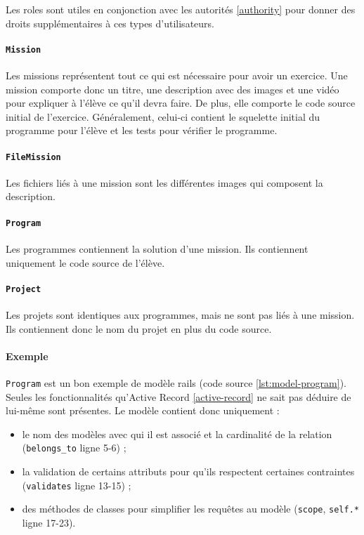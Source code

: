 Les \glspl{role} sont utiles en conjonction avec les autorités \ref{authority} pour donner des droits supplémentaires à ces types d'utilisateurs.

\paragraph{\texttt{Mission}} Les \glspl{mission} représentent tout ce qui est nécessaire pour avoir un exercice. Une \gls{mission} comporte donc un titre, une description avec des images et une vidéo pour expliquer à l'élève ce qu'il devra faire. De plus, elle comporte le code source initial de l'exercice. Généralement, celui-ci contient le squelette initial du programme pour l'élève et les tests pour vérifier le programme.

\paragraph{\texttt{FileMission}} Les fichiers liés à une \gls{mission} sont les différentes images qui composent la description.

\paragraph{\texttt{Program}} Les programmes contiennent la solution d'une \gls{mission}. Ils contiennent uniquement le code source de l'élève.

\paragraph{\texttt{Project}} Les projets sont identiques aux programmes, mais ne sont pas liés à une \gls{mission}. Ils contiennent donc le nom du projet en plus du code source.

\paragraph{Exemple} \texttt{Program} est un bon exemple de modèle \gls{rails} (code source \ref{lst:model-program}). Seules les fonctionnalités qu’Active Record \ref{active-record} ne sait pas déduire de lui-même sont présentes. Le modèle contient donc uniquement :
\begin{itemize}
  \item le nom des modèles avec qui il est associé et la cardinalité de la relation (\lstinline[language=Rails]{belongs_to} ligne 5-6) ;
  \item la validation de certains attributs pour qu'ils respectent certaines contraintes (\lstinline[language=Rails]{validates} ligne 13-15) ;
  \item des méthodes de classes pour simplifier les requêtes au modèle (\lstinline[language=Rails]{scope},  \lstinline[language=Rails]{self.*} ligne 17-23).
\end{itemize}

